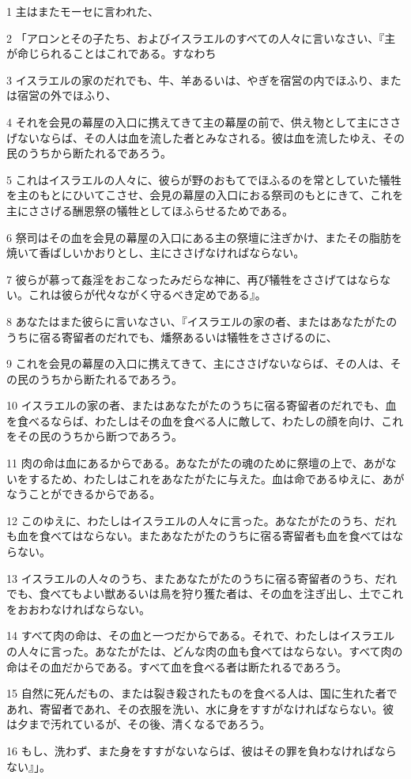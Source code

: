\par 1 主はまたモーセに言われた、
\par 2 「アロンとその子たち、およびイスラエルのすべての人々に言いなさい、『主が命じられることはこれである。すなわち
\par 3 イスラエルの家のだれでも、牛、羊あるいは、やぎを宿営の内でほふり、または宿営の外でほふり、
\par 4 それを会見の幕屋の入口に携えてきて主の幕屋の前で、供え物として主にささげないならば、その人は血を流した者とみなされる。彼は血を流したゆえ、その民のうちから断たれるであろう。
\par 5 これはイスラエルの人々に、彼らが野のおもてでほふるのを常としていた犠牲を主のもとにひいてこさせ、会見の幕屋の入口におる祭司のもとにきて、これを主にささげる酬恩祭の犠牲としてほふらせるためである。
\par 6 祭司はその血を会見の幕屋の入口にある主の祭壇に注ぎかけ、またその脂肪を焼いて香ばしいかおりとし、主にささげなければならない。
\par 7 彼らが慕って姦淫をおこなったみだらな神に、再び犠牲をささげてはならない。これは彼らが代々ながく守るべき定めである』。
\par 8 あなたはまた彼らに言いなさい、『イスラエルの家の者、またはあなたがたのうちに宿る寄留者のだれでも、燔祭あるいは犠牲をささげるのに、
\par 9 これを会見の幕屋の入口に携えてきて、主にささげないならば、その人は、その民のうちから断たれるであろう。
\par 10 イスラエルの家の者、またはあなたがたのうちに宿る寄留者のだれでも、血を食べるならば、わたしはその血を食べる人に敵して、わたしの顔を向け、これをその民のうちから断つであろう。
\par 11 肉の命は血にあるからである。あなたがたの魂のために祭壇の上で、あがないをするため、わたしはこれをあなたがたに与えた。血は命であるゆえに、あがなうことができるからである。
\par 12 このゆえに、わたしはイスラエルの人々に言った。あなたがたのうち、だれも血を食べてはならない。またあなたがたのうちに宿る寄留者も血を食べてはならない。
\par 13 イスラエルの人々のうち、またあなたがたのうちに宿る寄留者のうち、だれでも、食べてもよい獣あるいは鳥を狩り獲た者は、その血を注ぎ出し、土でこれをおおわなければならない。
\par 14 すべて肉の命は、その血と一つだからである。それで、わたしはイスラエルの人々に言った。あなたがたは、どんな肉の血も食べてはならない。すべて肉の命はその血だからである。すべて血を食べる者は断たれるであろう。
\par 15 自然に死んだもの、または裂き殺されたものを食べる人は、国に生れた者であれ、寄留者であれ、その衣服を洗い、水に身をすすがなければならない。彼は夕まで汚れているが、その後、清くなるであろう。
\par 16 もし、洗わず、また身をすすがないならば、彼はその罪を負わなければならない』」。

